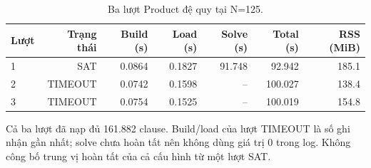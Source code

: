 \begin{table}[pos=H]
\centering
\footnotesize
\caption{Ba lượt Product đệ quy tại N=125.}
\label{tab:partial_product}
\setlength{\tabcolsep}{4pt}
\begin{tabular}{@{}lrrrrrr@{}}
\toprule
Lượt & Trạng thái & Build (s) & Load (s) & Solve (s) & Total (s) & RSS (MiB) \\
\midrule
1 & SAT & 0.0864 & 0.1827 & 91.748 & 92.942 & 185.1 \\
2 & TIMEOUT & 0.0742 & 0.1598 & -- & 100.027 & 138.4 \\
3 & TIMEOUT & 0.0754 & 0.1525 & -- & 100.019 & 154.8 \\
\bottomrule
\end{tabular}
\par\smallskip\begin{minipage}{\linewidth}\footnotesize Cả ba lượt đã nạp đủ 161.882 clause. Build/load của lượt TIMEOUT là số ghi nhận gần nhất; solve chưa hoàn tất nên không dùng giá trị 0 trong log. Không công bố trung vị hoàn tất của cả cấu hình từ một lượt SAT.\end{minipage}
\end{table}
